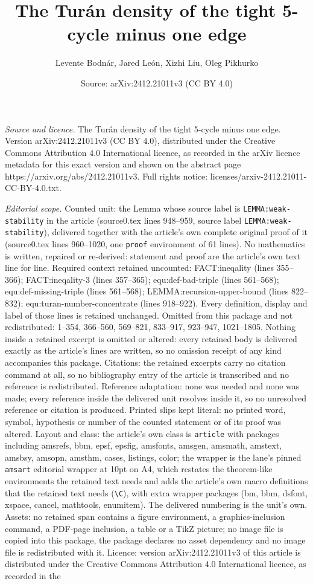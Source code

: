 \documentclass[10pt,a4paper]{amsart}
\title[The Tur\'an density of the tight 5-cycle minus one edge]{The Tur\'an density of the tight 5-cycle minus one edge}
\author{Levente Bodn\'ar, Jared Le\'on, Xizhi Liu, Oleg Pikhurko}
\date{Source: arXiv:2412.21011v3 (CC BY 4.0)}
\begin{document}
\maketitle

\noindent\emph{Source and licence.} The Tur\'an density of the tight 5-cycle minus one edge. Version arXiv:2412.21011v3 (CC BY 4.0), distributed under the Creative Commons Attribution 4.0 International licence, as recorded in the arXiv licence metadata for this exact version and shown on the abstract page https://arxiv.org/abs/2412.21011v3. Full rights notice: licenses/arxiv-2412.21011-CC-BY-4.0.txt.\par\smallskip

\noindent\textit{Editorial scope.} Counted unit: the Lemma whose source label is \texttt{LEMMA:weak-stability} in the article (source0.tex lines 948--959, source label \texttt{LEMMA:weak-stability}), delivered together with the article's own complete original proof of it (source0.tex lines 960--1020, one \texttt{proof} environment of 61 lines). No mathematics is written, repaired or re-derived: statement and proof are the article's own text line for line. Required context retained uncounted: FACT:ineqality (lines 355--366); FACT:ineqality-3 (lines 357--365); equ:def-bad-triple (lines 561--568); equ:def-missing-triple (lines 561--568); LEMMA:recursion-upper-bound (lines 822--832); equ:turan-number-concentrate (lines 918--922). Every definition, display and label of those lines is retained unchanged. Omitted from this package and not redistributed: 1--354, 366--560, 569--821, 833--917, 923--947, 1021--1805. Nothing inside a retained excerpt is omitted or altered: every retained body is delivered exactly as the article's lines are written, so no omission receipt of any kind accompanies this package. Citations: the retained excerpts carry no citation command at all, so no bibliography entry of the article is transcribed and no reference is redistributed. Reference adaptation: none was needed and none was made; every reference inside the delivered unit resolves inside it, so no unresolved reference or citation is produced. Printed slips kept literal: no printed word, symbol, hypothesis or number of the counted statement or of its proof was altered. Layout and class: the article's own class is \texttt{article} with packages including amsrefs, bbm, epsf, epsfig, amsfonts, amsgen, amsmath, amstext, amsbsy, amsopn, amsthm, cases, listings, color; the wrapper is the lane's pinned \texttt{amsart} editorial wrapper at 10pt on A4, which restates the theorem-like environments the retained text needs and adds the article's own macro definitions that the retained text needs (\texttt{\textbackslash C}), with extra wrapper packages (bm, bbm, dsfont, xspace, cancel, mathtools, enumitem). The delivered numbering is the unit's own. Assets: no retained span contains a figure environment, a graphics-inclusion command, a PDF-page inclusion, a table or a TikZ picture; no image file is copied into this package, the package declares no asset dependency and no image file is redistributed with it. Licence: version arXiv:2412.21011v3 of this article is distributed under the Creative Commons Attribution 4.0 International licence, as recorded in the 
\end{document}
